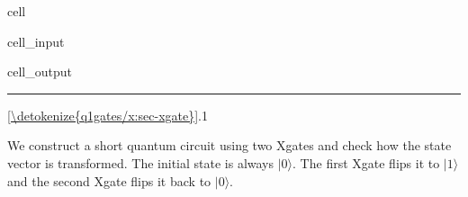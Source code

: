 \documentclass[letterpaper,10pt,english]{jupyterBook}
\begin{document}
\begin{sphinxuseclass}{cell}\begin{sphinxVerbatimInput}

\begin{sphinxuseclass}{cell_input}
\begin{sphinxVerbatim}[commandchars=\\\{\}]
   
\end{sphinxVerbatim}

\end{sphinxuseclass}\end{sphinxVerbatimInput}
\begin{sphinxVerbatimOutput}

\begin{sphinxuseclass}{cell_output}
\noindent{}

\end{sphinxuseclass}\end{sphinxVerbatimOutput}

\end{sphinxuseclass}

\bigskip\hrule\bigskip


\sphinxAtStartPar
{} \hyperref[\detokenize{q1gates/x:sec-xgate}]{\ref{\detokenize{q1gates/x:sec-xgate}}}.1

\sphinxAtStartPar
We construct a short quantum circuit using two Xgates and check how the state vector is transformed.  The initial state is always \(|0\rangle\).  The first Xgate flips it to \(|1\rangle\) and the second Xgate flips it back to \(|0\rangle\).
\end{document}

